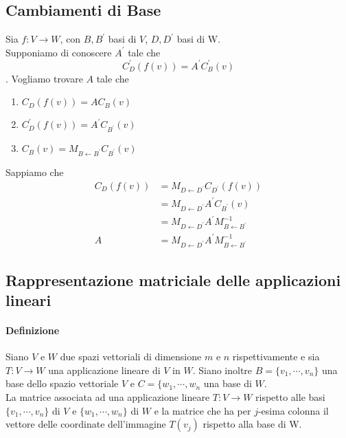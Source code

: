 \documentclass[a4paper, 10pt]{article}
\begin{document}
	\subsection{Cambiamenti di Base}
	Sia $f : V \rightarrow W $, con $B, B^{'}$ basi di $V$, $D,D^{'}$ basi di W. \\
	Supponiamo di conoscere $A^{'}$ tale che 
	\[ C_D^{'}(f(v)) = A^{'}C_B^{'}(v) \]. Vogliamo trovare $A$ tale che 
	\begin{enumerate}
		\item $C_D(f(v)) = AC_B(v)$
		\item $C_D^{'}(f(v)) = A^{'}C_{B^{'}}(v)$
		\item $C_B(v) = M_{B \leftarrow B^{'}}C_{B^{'}}(v)$
	\end{enumerate}
	Sappiamo che 
	\begin{equation*}
		\begin{split}
			C_D(f(v)) &= M_{D \leftarrow D^{'}}C_{D^{'}}(f(v)) \\
			&= M_{D \leftarrow D^{'}}A^{'}C_{B^{'}}(v) \\
			&= M_{D \leftarrow D^{'}}A^{'}M^{-1}_{B \leftarrow B^{'}}\\
			A &= M_{D \leftarrow D^{'}}A^{'}M^{-1}_{B \leftarrow B^{'}}
		\end{split}
	\end{equation*}

	\subsection{Rappresentazione matriciale delle applicazioni \\ lineari} 
	\paragraph*{Definizione}
	Siano $V$ e $W$ due spazi vettoriali di dimensione $m$ e $n$ rispettivamente e sia $T : V
	\rightarrow W$ una applicazione lineare di $V$ in $W$. Siano inoltre $B = \lbrace v_1 , \cdots, v_n \rbrace$ una base 
	dello spazio vettoriale $V$ e $C = \lbrace w_1, \cdots, w_n$ una base di $W$.\\
	La matrice associata ad una applicazione lineare $T : V \rightarrow W$ rispetto alle basi $\lbrace v_1,
	\cdots, v_n \rbrace$ di $V$ e $ \lbrace w_1 , \cdots , w_n \rbrace$ di $W$ e la matrice che ha per $j$-esima
	colonna il vettore delle coordinate dell'immagine $T(v_j)$ rispetto alla base di W.
\end{document}
